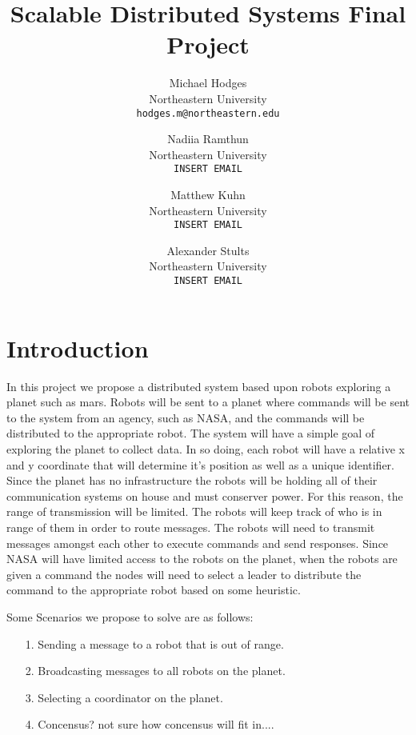 \documentclass[10pt,twocolumn,letterpaper]{article}
\begin{document}
\title{Scalable Distributed Systems Final Project}

\author{Michael Hodges\\
Northeastern University\\
{\tt\small hodges.m@northeastern.edu}
\and 
Nadiia Ramthun\\
Northeastern University\\
{\tt\small INSERT EMAIL}
\and
Matthew Kuhn\\
Northeastern University\\
{\tt\small INSERT EMAIL}
\and
Alexander Stults\\
Northeastern University\\
{\tt\small INSERT EMAIL}
}

\maketitle

\section{Introduction}
In this project we propose a distributed system based upon robots exploring a planet such as mars. Robots will be sent to a planet where commands will be sent to the system from an agency, such as NASA, and the commands will be distributed to the appropriate robot. The system will have a simple goal of exploring the planet to collect data. In so doing, each robot will have a relative x and y coordinate that will determine it's position as well as a unique identifier. Since the planet has no infrastructure the robots will be holding all of their communication systems on house and must conserver power. For this reason, the range of transmission will be limited. The robots will keep track of who is in range of them in order to route messages. The robots will need to transmit messages amongst each other to execute commands and send responses. Since NASA will have limited access to the robots on the planet, when the robots are given a command the nodes will need to select a leader to distribute the command to the appropriate robot based on some heuristic.

Some Scenarios we propose to solve are as follows:
\begin{enumerate}
    \item [1.] Sending a message to a robot that is out of range.
    \item [2.] Broadcasting messages to all robots on the planet.
    \item [3.] Selecting a coordinator on the planet.
    \item [4.] Concensus? not sure how concensus will fit in....
\end{enumerate}
\end{document}
